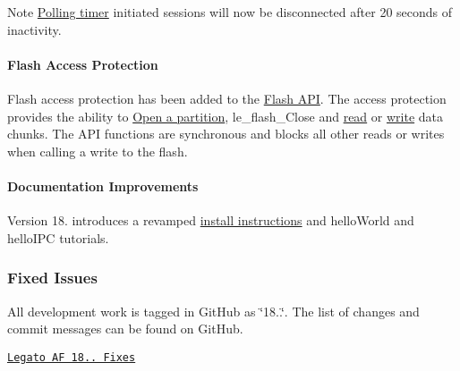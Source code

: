 \begin{DoxyNote}{Note}
\hyperlink{c_le_avc_c_le_avc_PollingTimer}{Polling timer} initiated sessions will now be disconnected after 20 seconds of inactivity.
\end{DoxyNote}
\hypertarget{releaseNotes18010_rn1801_Features_flash}{}\paragraph{Flash Access Protection}\label{releaseNotes18010_rn1801_Features_flash}
Flash access protection has been added to the \hyperlink{c_flash}{Flash A\+PI}. The access protection provides the ability to \hyperlink{c_flash_le_flash_Open}{Open a partition}, le\+\_\+flash\+\_\+\+Close and \hyperlink{c_flash_le_flash_Read}{read} or \hyperlink{c_flash_le_flash_Write}{write} data chunks. The A\+PI functions are synchronous and blocks all other reads or writes when calling a write to the flash.\hypertarget{releaseNotes18010_rn1801_Features_docs}{}\paragraph{Documentation Improvements}\label{releaseNotes18010_rn1801_Features_docs}
Version 18. introduces a revamped \hyperlink{basicBuild}{install instructions} and hello\+World and hello\+I\+PC tutorials.\hypertarget{releaseNotes18010_rn1801_Fixes}{}\subsubsection{Fixed Issues}\label{releaseNotes18010_rn1801_Fixes}
All development work is tagged in Git\+Hub as \char`\"{}18..\char`\"{}. The list of changes and commit messages can be found on Git\+Hub.


\begin{DoxyItemize}
\item \href{https://github.com/legatoproject/legato-af/commits/18.01.0}{\tt Legato AF 18.. Fixes}
\end{DoxyItemize}

